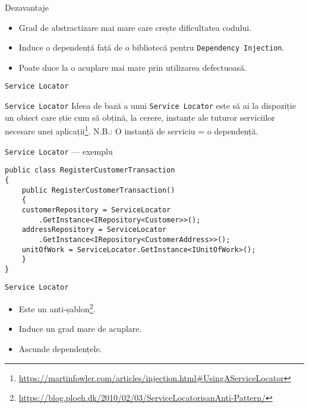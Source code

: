 \documentclass[presentation]{beamer}
\begin{document}
\begin{frame}[label={sec:org6813d9f},fragile]{Dezavantaje}
 \begin{itemize}
\item Grad de abstractizare mai mare care crește dificultatea codului.
\item Induce o dependență față de o bibliotecă pentru \texttt{Dependency Injection}.
\item Poate duce la o acuplare mai mare prin utilizarea defectuoasă.
\end{itemize}
\end{frame}
\begin{frame}[label={sec:orgfdd4dea},fragile]{\texttt{Service Locator}}
 \begin{block}{\texttt{Service Locator}}
  Ideea de bază a unui \texttt{Service Locator} este să ai la dispoziție un obiect care știe cum să obțină, la cerere, instanțe ale tuturor serviciilor necesare unei aplicații\footnote{\url{https://martinfowler.com/articles/injection.html\#UsingAServiceLocator}}.
\vskip 0.5in
\alert{N.B.}: O instanță de serviciu = o dependență.
\end{block}
\end{frame}
\begin{frame}[label={sec:orgc68b1a5},fragile]{\texttt{Service Locator} --- exemplu}
 \begin{verbatim}
public class RegisterCustomerTransaction
{
    public RegisterCustomerTransaction()
    {
	customerRepository = ServiceLocator
	    .GetInstance<IRepository<Customer>>();
	addressRepository = ServiceLocator
	    .GetInstance<IRepository<CustomerAddress>>();
	unitOfWork = ServiceLocator.GetInstance<IUnitOfWork>();
    }
}
\end{verbatim}
\end{frame}
\begin{frame}[label={sec:org2d060d1},fragile]{\texttt{Service Locator}}
 \begin{itemize}
\item \alert{Este un anti-șablon}\footnote{\url{https://blog.ploeh.dk/2010/02/03/ServiceLocatorisanAnti-Pattern/}}.
\item Induce un grad mare de acuplare.
\item Ascunde dependențele.
\end{itemize}
\end{frame}
\end{document}
